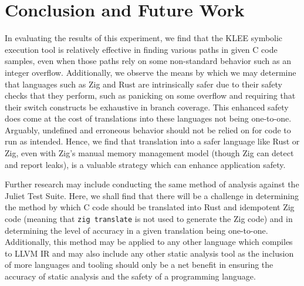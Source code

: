 \documentclass[conference]{IEEEtran}
\begin{document}
\section{Conclusion and Future Work}
In evaluating the results of this experiment, we find that the KLEE symbolic
execution tool is relatively effective in finding various paths in given C
code samples, even when those paths rely on some non-standard behavior such
as an integer overflow. Additionally, we observe the means by which we may
determine that languages such as Zig and Rust are intrinsically safer due to
their safety checks that they perform, such as panicking on some overflow and
requiring that their switch constructs be exhaustive in branch coverage. This
enhanced safety does come at the cost of translations into these languages not
being one-to-one. Arguably, undefined and erroneous behavior should not be
relied on for code to run as intended. Hence, we find that translation into a
safer language like Rust or Zig, even with Zig's manual memory management
model (though Zig can detect and report leaks), is a valuable strategy which
can enhance application safety.

Further research may include conducting the same method of analysis against
the Juliet Test Suite. Here, we shall find that there will be a challenge in
determining the method by which C code should be translated into Rust and
idempotent Zig code (meaning that \texttt{zig translate} is not used to
generate the Zig code) and in determining the level of accuracy in a given
translation being one-to-one. Additionally, this method may be applied to
any other language which compiles to LLVM IR and may also include any other
static analysis tool as the inclusion of more languages and tooling should
only be a net benefit in ensuring the accuracy of static analysis and the
safety of a programming language.




\end{document}
